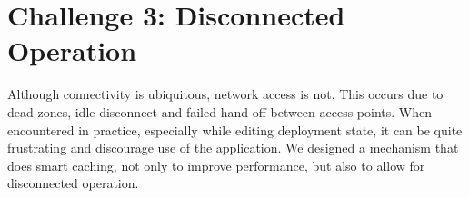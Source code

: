 



\section{Challenge 3: Disconnected Operation}
Although connectivity is ubiquitous, network access is not.  This occurs due to dead zones, 
idle-disconnect and failed hand-off between access points.  When encountered in practice, especially while editing
deployment state, it can be quite frustrating and discourage use of the application.  We designed a
mechanism that does smart caching, not only to improve performance, but also to allow for disconnected operation.




